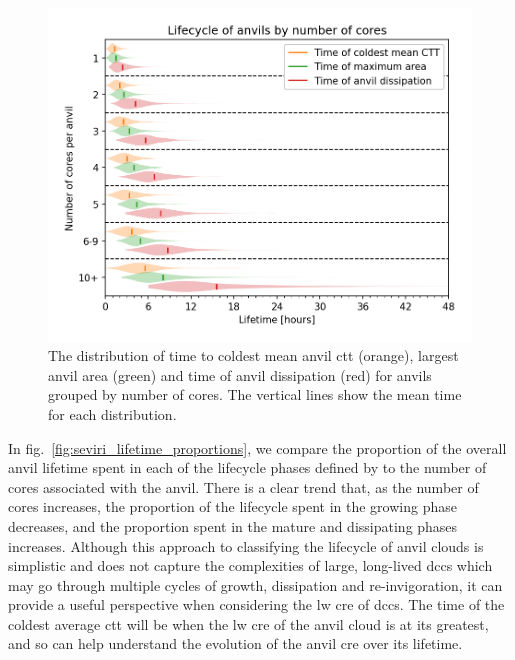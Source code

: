 \documentclass[acp, manuscript]{copernicus}
\begin{document}
\begin{figure}[tp]
    \includegraphics[width=12cm]{figures/fig08.png}
    \caption[
    The distribution of time to coldest mean anvil \acrshort{ctt}, largest anvil area and time of anvil dissipation
    ]{
    The distribution of time to coldest mean anvil \acrshort{ctt} (orange), largest anvil area (green) and time of anvil dissipation (red) for anvils grouped by number of cores. The vertical lines show the mean time for each distribution.
    }
    \label{fig:seviri_lifetime_dists}
\end{figure}


In fig.~\ref{fig:seviri_lifetime_proportions}, we compare the proportion of the overall anvil lifetime spent in each of the lifecycle phases defined by \citet{futyan_deep_2007} to the number of cores associated with the anvil. 
There is a clear trend that, as the number of cores increases, the proportion of the lifecycle spent in the growing phase decreases, and the proportion spent in the mature and dissipating phases increases.
 Although this approach to classifying the lifecycle of anvil clouds is simplistic and does not capture the complexities of large, long-lived \acrshort{dcc}s which may go through multiple cycles of growth, dissipation and re-invigoration, it can provide a useful perspective when considering the \acrshort{lw} \acrshort{cre} of \acrshort{dcc}s. 
 The time of the coldest average \acrshort{ctt} will be when the \acrshort{lw} \acrshort{cre} of the anvil cloud is at its greatest, and so can help understand the evolution of the anvil \acrshort{cre} over its lifetime.
\end{document}
